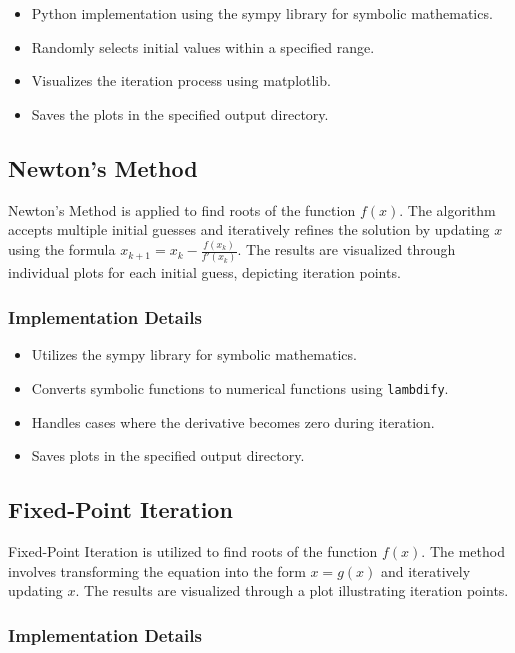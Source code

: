 \documentclass[12pt, letterpaper]{article}
\begin{document}
\begin{itemize}
    \item Python implementation using the sympy library for symbolic mathematics.
    \item Randomly selects initial values within a specified range.
    \item Visualizes the iteration process using matplotlib.
    \item Saves the plots in the specified output directory.
\end{itemize}

\subsection*{Newton's Method}

Newton's Method is applied to find roots of the function \(f(x)\). The algorithm accepts multiple initial guesses and iteratively refines the solution by updating \(x\) using the formula \(x_{k+1} = x_k - \frac{f(x_k)}{f'(x_k)}\). The results are visualized through individual plots for each initial guess, depicting iteration points.

\subsubsection*{Implementation Details}

\begin{itemize}
    \item Utilizes the sympy library for symbolic mathematics.
    \item Converts symbolic functions to numerical functions using \texttt{lambdify}.
    \item Handles cases where the derivative becomes zero during iteration.
    \item Saves plots in the specified output directory.
\end{itemize}

\subsection*{Fixed-Point Iteration}

Fixed-Point Iteration is utilized to find roots of the function \(f(x)\). The method involves transforming the equation into the form \(x = g(x)\) and iteratively updating \(x\). The results are visualized through a plot illustrating iteration points.

\subsubsection*{Implementation Details}
\end{document}
